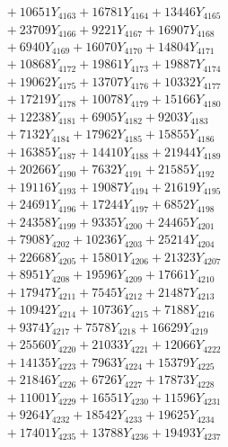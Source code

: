 \documentclass[a4paper,10pt]{article}
\begin{document}
{\begin{align}
&\;  + 10651 Y_{4163} + 16781 Y_{4164} + 13446 Y_{4165} \\[0.3ex]
&\;  + 23709 Y_{4166} + 9221 Y_{4167} + 16907 Y_{4168} \\[0.5ex]\allowbreak
&\;  + 6940 Y_{4169} + 16070 Y_{4170} + 14804 Y_{4171} \\[0.3ex]
&\;  + 10868 Y_{4172} + 19861 Y_{4173} + 19887 Y_{4174} \\[0.3ex]
&\;  + 19062 Y_{4175} + 13707 Y_{4176} + 10332 Y_{4177} \\[0.3ex]
&\;  + 17219 Y_{4178} + 10078 Y_{4179} + 15166 Y_{4180} \\[0.3ex]
&\;  + 12238 Y_{4181} + 6905 Y_{4182} + 9203 Y_{4183} \\[0.3ex]
&\;  + 7132 Y_{4184} + 17962 Y_{4185} + 15855 Y_{4186} \\[0.3ex]
&\;  + 16385 Y_{4187} + 14410 Y_{4188} + 21944 Y_{4189} \\[0.3ex]
&\;  + 20266 Y_{4190} + 7632 Y_{4191} + 21585 Y_{4192} \\[0.3ex]
&\;  + 19116 Y_{4193} + 19087 Y_{4194} + 21619 Y_{4195} \\[0.3ex]
&\;  + 24691 Y_{4196} + 17244 Y_{4197} + 6852 Y_{4198} \\[0.5ex]\allowbreak
&\;  + 24358 Y_{4199} + 9335 Y_{4200} + 24465 Y_{4201} \\[0.3ex]
&\;  + 7908 Y_{4202} + 10236 Y_{4203} + 25214 Y_{4204} \\[0.3ex]
&\;  + 22668 Y_{4205} + 15801 Y_{4206} + 21323 Y_{4207} \\[0.3ex]
&\;  + 8951 Y_{4208} + 19596 Y_{4209} + 17661 Y_{4210} \\[0.3ex]
&\;  + 17947 Y_{4211} + 7545 Y_{4212} + 21487 Y_{4213} \\[0.3ex]
&\;  + 10942 Y_{4214} + 10736 Y_{4215} + 7188 Y_{4216} \\[0.3ex]
&\;  + 9374 Y_{4217} + 7578 Y_{4218} + 16629 Y_{4219} \\[0.3ex]
&\;  + 25560 Y_{4220} + 21033 Y_{4221} + 12066 Y_{4222} \\[0.3ex]
&\;  + 14135 Y_{4223} + 7963 Y_{4224} + 15379 Y_{4225} \\[0.3ex]
&\;  + 21846 Y_{4226} + 6726 Y_{4227} + 17873 Y_{4228} \\[0.5ex]\allowbreak
&\;  + 11001 Y_{4229} + 16551 Y_{4230} + 11596 Y_{4231} \\[0.3ex]
&\;  + 9264 Y_{4232} + 18542 Y_{4233} + 19625 Y_{4234} \\[0.3ex]
&\;  + 17401 Y_{4235} + 13788 Y_{4236} + 19493 Y_{4237} \\[0.3ex]

\end{align}}
\end{document}
